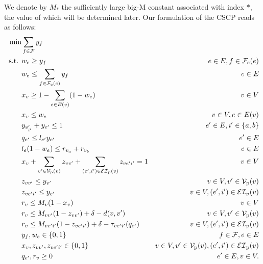 We denote by $M_{*}$ the sufficiently large big-M constant associated with index $*$, the value of which will be determined later. Our formulation of the CSCP reads as follows:
\begin{subequations}
	\label{milpa}
	\begin{align}
   	\min & \sum_{f \in \mathcal F} y_f \label{milpa.obj} \\
	\textup{ s.t. }   & w_{e} \ge y_{f}   &  e \in E, f \in \mathcal F_{\mathrm{c}}(e) \label{milpa.completecover1}\\
      	& w_{e} \le  \sum_{f \in \mathcal F_{\mathrm{c}}(e)}y_{f} 	&  e \in E \label{milpa.completecover2}\\
      	& x_{v}\geq 1-\sum_{e\in E(v)} (1-w_e) &  v\in V \label{milpa.enforcex1}\\
      	& x_{v}\leq w_e &  v\in V, e\in E(v) \label{milpa.enforcex2}\\
	&  y_{v'_{i'}} + y_{e'} \le 1 &   e' \in E, i' \in \{a,b\} \label{milpa.optimale}\\
	& q_{e'}\leq l_{e'}y_{e'} & e'\in E  \label{milpa.coord} \\
	&  l_e (1 - w_e) \le  r_{v_a} + r_{v_b}	& e \in E \label{milpa.covere}\\
  &  x_{v} +\sum_{v' \in \mathcal V_{\mathrm{p}}(v)}  z_{vv'}+ \sum_{(e', i') \in {\mathcal {EI}}_{\mathrm{p}}(v)} z_{ve'i'} = 1  &   v\in V \label{milpa.lcoversos} \\
  &   z_{vv'} \le y_{v'}  &  v \in V,  v' \in \mathcal V_{\mathrm{p}}(v) \label{milpa.indicatorv}\\  
	&   z_{ve'i'} \le y_{e'}  &  v \in V,  (e',i') \in {\mathcal {EI}}_{\mathrm{p}}(v) \label{milpa.indicatorei}\\  
 &   r_{v} \le M_v (1-x_{v}) &  v\in V \label{milpa.wbdl}\\
 &   r_{v} \le M_{vv'}(1 - z_{vv'})  +  \delta - d(v,v') & v \in V ,  v' \in \mathcal V_{\mathrm{p}}(v) \label{milpa.coverdist-node} \\
 &   r_{v} \le M_{ve'i'}(1 - z_{ve'{i'}})  +  \delta - \tau_{ve'i'}(q_{e'}) & v \in V ,  (e',i') \in {\mathcal {EI}}_{\mathrm{p}}(v) \label{milpa.coverdist-edge} \\
   &  y_f, w_e  \in \{0,1\} &   f \in \mathcal F,  e \in E \label{milpa.varyw}\\
   & x_{v}, z_{vv'}, z_{ve'{i'}} \in \{0,1\}  & v \in V, v' \in \mathcal V_{\mathrm{p}}(v),(e',i') \in {\mathcal {EI}}_{\mathrm{p}}(v)\label{milpa.varindicator}\\
  	& q_{e'}, r_{v} \geq 0 &  e'  \in E, v \in V. \label{milpa.varcontinuous}
	\end{align}
	\end{subequations}
